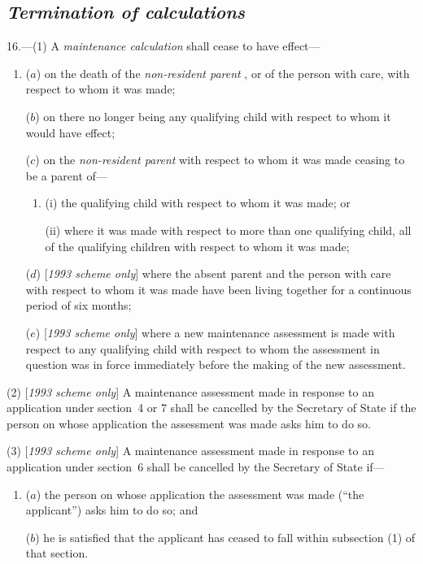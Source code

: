 \documentclass[12pt,a4paper]{article}
\begin{document}
\subsection*{\itshape Termination of 
\emph{calculations}  %
}

16.---(1) A 
\emph{maintenance calculation}  %
shall cease to have effect—
\begin{enumerate}\item[]
($a$) on the death of the 
\emph{non-resident parent}%
, or of the person with care, with respect to whom it was made;

($b$) on there no longer being any qualifying child with respect to whom it would have effect;

($c$) on the 
\emph{non-resident parent}  %
with respect to whom it was made ceasing to be a parent of—
\begin{enumerate}\item[]
(i) the qualifying child with respect to whom it was made; or

(ii) where it was made with respect to more than one qualifying child, all of the qualifying children with respect to whom it was made;
\end{enumerate}

($d$) [\emph{1993 scheme only}] where the absent parent and the person with care with respect to whom it was made have been living together for a continuous period of six months;

($e$) [\emph{1993 scheme only}] where a new maintenance assessment is made with respect to any qualifying child with respect to whom the assessment in question was in force immediately before the making of the new assessment.
\end{enumerate}

(2) [\emph{1993 scheme only}] A maintenance assessment made in response to an application under section~4 or 7 shall be cancelled by 
the Secretary of State  %
if the person on whose application the assessment was made asks him to do so.

(3) [\emph{1993 scheme only}] A maintenance assessment made in response to an application under section~6 shall be cancelled by 
the Secretary of State  %
if—
\begin{enumerate}\item[]
($a$) the person on whose application the assessment was made (“the applicant”) asks him to do so; and

($b$) he is satisfied that the applicant has ceased to fall within subsection (1)  of that section.
\end{enumerate}
\end{document}
